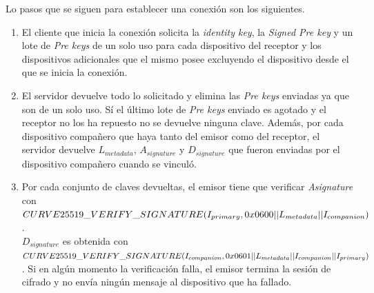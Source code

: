 Lo pasos que se siguen para establecer una conexión son los siguientes.
\begin{enumerate}
	\item El cliente que inicia la conexión solicita la \emph{identity key}, la \emph{Signed Pre key} y un lote de \emph{Pre keys} de un solo uso para cada dispositivo del receptor y los dispositivos adicionales que el mismo posee excluyendo el dispositivo desde el que se inicia la conexión. 
	\item El servidor devuelve todo lo solicitado y elimina las \emph{Pre keys} enviadas ya que son de un solo uso. Sí el último lote de \emph{Pre keys} enviado es agotado y el receptor no los ha repuesto no se devuelve ninguna clave. Además, por cada dispositivo compañero que haya tanto del emisor como del receptor, el servidor devuelve $L_{metadata}$, $A_{signature}$ y $D_{signature}$ que fueron enviadas por el dispositivo compañero cuando se vinculó.
	\item Por cada conjunto de claves devueltas, el emisor tiene que verificar \emph{Asignature} con\\ $CURVE25519\_VERIFY \_SIGNATURE(I_{primary}, 0x0600 || L_{metadata}\\ || I_{companion})$.\\
	$D_{signature}$ es obtenida con\\ $CURVE25519\_VERIFY\_SIGNATURE(I_{companion},0x0601 ||\\ L_{metadata} || I_{companion} || I_{primary})$.
	Si en algún momento la verificación falla, el emisor termina la sesión de cifrado y no envía ningún mensaje al dispositivo que ha fallado.
\end{enumerate}

